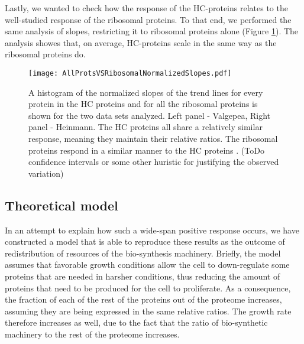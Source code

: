\documentclass[notitlepage]{article}
\begin{document}
Lastly, we wanted to check how the response of the HC-proteins relates to the well-studied response of the ribosomal proteins.
To that end, we performed the same analysis of slopes, restricting it to ribosomal proteins alone (Figure \ref{fig:globalfit}).
The analysis showes that, on average, HC-proteins scale in the same way as the ribosomal proteins do.

\begin{figure}[h]
\centering
\texttt{[image: AllProtsVSRibosomalNormalizedSlopes.pdf]}
\caption{
    A histogram of the normalized slopes of the trend lines for every protein in the HC proteins and for all the ribosomal proteins is shown for the two data sets analyzed.
    Left panel - Valgepea, Right panel - Heinmann.
    The HC proteins all share a relatively similar response, meaning they maintain their relative ratios.
    The ribosomal proteins respond in a similar manner to the HC proteins .
    (ToDo confidence intervals or some other huristic for justifying the observed variation)
}
\label{fig:globalfit}
\end{figure}

\subsection{Theoretical model}
In an attempt to explain how such a wide-span positive response occurs, we have constructed a model that is able to reproduce these results as the outcome of redistribution of resources of the bio-synthesis machinery.
Briefly, the model assumes that favorable growth conditions allow the cell to down-regulate some proteins that are needed in harsher conditions, thus reducing the amount of proteins that need to be produced for the cell to proliferate.
As a consequence, the fraction of each of the rest of the proteins out of the proteome increases, assuming they are being expressed in the same relative ratios.
The growth rate therefore increases as well, due to the fact that the ratio of bio-synthetic machinery to the rest of the proteome increases.
\end{document}
